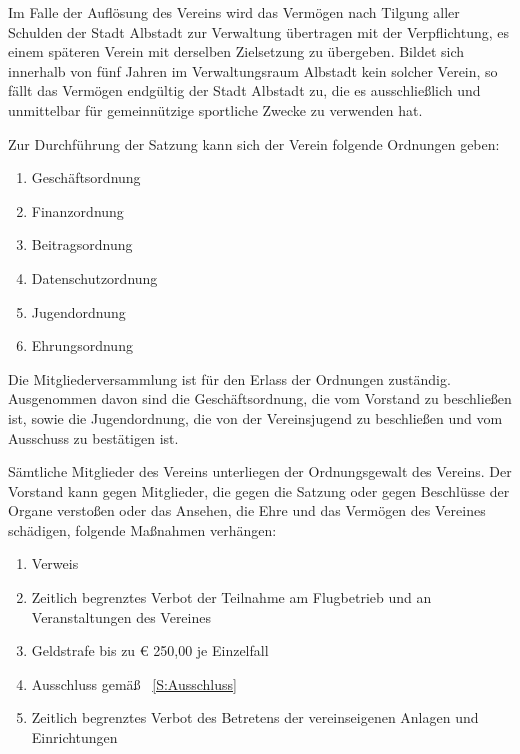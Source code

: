 \documentclass[10pt,a4paper,parskip=half]{scrartcl}
\begin{document}
\begin{contract}
\begin{multicols}{2}
\begin{enumerate}[label=\alph*),noitemsep]
\begin{enumerate}[label=\alph*),noitemsep]
    Im Falle der Auflösung des Vereins wird das Vermögen nach Tilgung aller Schulden der Stadt Albstadt zur Verwaltung übertragen mit der Verpflichtung,
    es einem späteren Verein mit derselben Zielsetzung zu übergeben.
    Bildet sich innerhalb von fünf Jahren im Verwaltungsraum Albstadt kein solcher Verein,
    so fällt das Vermögen endgültig der Stadt Albstadt zu,
    die es ausschließlich und unmittelbar für gemeinnützige sportliche Zwecke zu verwenden hat.
    
    
    Zur Durchführung der Satzung kann sich der Verein folgende Ordnungen geben:
    \begin{enumerate}[label=\alph*),noitemsep]
      \item Geschäftsordnung
      \item Finanzordnung
      \item Beitragsordnung
      \item Datenschutzordnung
      \item Jugendordnung
      \item Ehrungsordnung
    \end{enumerate}
    

    Die Mitgliederversammlung ist für den Erlass der Ordnungen zuständig.
    Ausgenommen davon sind die Geschäftsordnung,
    die vom Vorstand zu beschließen ist,
    sowie die Jugendordnung,
    die von der Vereinsjugend zu beschließen und vom Ausschuss zu bestätigen ist.
    
    
    Sämtliche Mitglieder des Vereins unterliegen der Ordnungsgewalt des Vereins.
    Der Vorstand kann gegen Mitglieder,
    die gegen die Satzung oder gegen Beschlüsse der Organe verstoßen oder das Ansehen,
    die Ehre und das Vermögen des Vereines schädigen,
    folgende Maßnahmen verhängen:
    \begin{enumerate}[label=\alph*),noitemsep]
      \item Verweis
      \item Zeitlich begrenztes Verbot der Teilnahme am Flugbetrieb und an Veranstaltungen des Vereines
      \item Geldstrafe bis zu € 250,00 je Einzelfall
      \item Ausschluss gemäß ~\autoref{S:Ausschluss}
      \item Zeitlich begrenztes Verbot des Betretens der vereinseigenen Anlagen und Einrichtungen
    \end{enumerate}
    

\end{enumerate}
\end{enumerate}
\end{multicols}
\end{contract}
\end{document}
